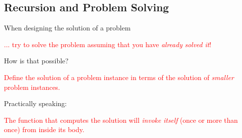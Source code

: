 \documentclass[t,handout,9pt]{beamer}
\begin{document}
\subsection{Recursion and Problem Solving}
\begin{frame}
\vfill
When designing the solution of a problem
\begin{center}
	\textcolor{red}{... try to solve the problem assuming that you have \textit{already solved it}!}
\end{center}
\vfill
How is that possible?
\begin{center}
	\textcolor{red}{Define the solution of a problem instance in terms of the solution of \textit{smaller} problem instances.}
\end{center}
\vfill
Practically speaking:
\begin{center}
	\textcolor{red}{The function that computes the solution will \textit{invoke itself} (once or more than once) from inside its body.}
\end{center}
\vfill
\end{frame}
%
\end{document}
